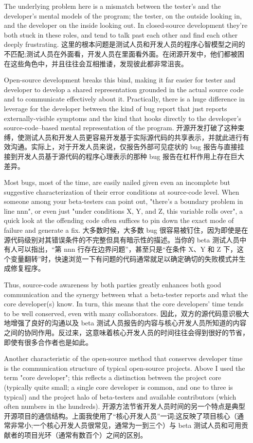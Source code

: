 \documentclass[a4paper,12pt,UTF8,twoside]{ctexbook}
\begin{document}
The underlying problem here is a mismatch between the tester's and the developer's mental models of the program; the tester, on the outside looking in, and the developer on the inside looking out. In closed-source development they're both stuck in these roles, and tend to talk past each other and find each other deeply frustrating.
这里的根本问题是测试人员和开发人员的程序心智模型之间的不匹配;测试人员在外面看，开发人员在里面看外面。在闭源开发中，他们都被困在这些角色中，并且往往会互相推诿，发现彼此都非常沮丧。

Open-source development breaks this bind, making it far easier for tester and developer to develop a shared representation grounded in the actual source code and to communicate effectively about it. Practically, there is a huge difference in leverage for the developer between the kind of bug report that just reports externally-visible symptoms and the kind that hooks directly to the developer's source-code–based mental representation of the program.
开源开发打破了这种束缚，使测试人员和开发人员更容易开发基于实际源代码的共享表示，并就此进行有效沟通。实际上，对于开发人员来说，仅报告外部可见症状的 bug 报告与直接挂接到开发人员基于源代码的程序心理表示的那种 bug 报告在杠杆作用上存在巨大差异。

Most bugs, most of the time, are easily nailed given even an incomplete but suggestive characterization of their error conditions at source-code level. When someone among your beta-testers can point out, "there's a boundary problem in line nnn", or even just "under conditions X, Y, and Z, this variable rolls over", a quick look at the offending code often suffices to pin down the exact mode of failure and generate a fix.
大多数时候，大多数 bug 很容易被钉住，因为即使是在源代码级别对其错误条件的不完整但具有暗示性的描述。当你的 beta 测试人员中有人可以指出，“第 nnn 行存在边界问题”，甚至只是“在条件 X、Y 和 Z 下，这个变量翻转”时，快速浏览一下有问题的代码通常就足以确定确切的失败模式并生成修复程序。

Thus, source-code awareness by both parties greatly enhances both good communication and the synergy between what a beta-tester reports and what the core developer(s) know. In turn, this means that the core developers' time tends to be well conserved, even with many collaborators.
因此，双方的源代码意识极大地增强了良好的沟通以及 beta 测试人员报告的内容与核心开发人员所知道的内容之间的协同作用。反过来，这意味着核心开发人员的时间往往会得到很好的节省，即使有很多合作者也是如此。

Another characteristic of the open-source method that conserves developer time is the communication structure of typical open-source projects. Above I used the term "core developer"; this reflects a distinction between the project core (typically quite small; a single core developer is common, and one to three is typical) and the project halo of beta-testers and available contributors (which often numbers in the hundreds).
开源方法节省开发人员时间的另一个特点是典型开源项目的通信结构。上面我使用了“核心开发人员”一词;这反映了项目核心（通常非常小;一个核心开发人员很常见，通常为一到三个）与 beta 测试人员和可用贡献者的项目光环（通常有数百个）之间的区别。
\end{document}
